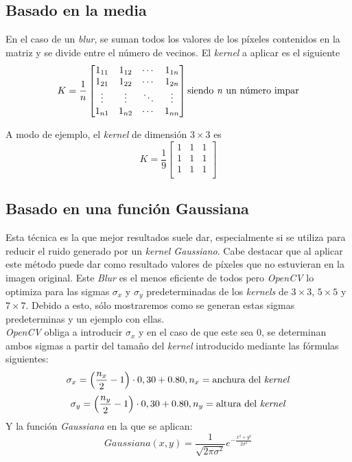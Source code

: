 \subsection{Basado en la media}
En el caso de un \emph{blur}, se suman todos los valores de los
píxeles contenidos en la matriz y se divide entre el número de
vecinos. El \emph{kernel} a aplicar es el siguiente
\begin{equation*}
  K = \frac{1}{n}
  \begin{bmatrix}
    1_{11} & 1_{12} & \cdots & 1_{1n} \\
    1_{21} & 1_{22} & \cdots & 1_{2n} \\
    \vdots & \vdots & \ddots & \vdots \\
    1_{n1} & 1_{n2} & \cdots & 1_{nn} \\
  \end{bmatrix}
  \text{siendo \emph{n} un número impar}
\end{equation*}

A modo de ejemplo, el \emph{kernel} de dimensión $3\times3$ es
\begin{equation*}
  K = \frac{1}{9}
  \begin{bmatrix}
    1 & 1 & 1 \\
    1 & 1 & 1 \\
    1 & 1 & 1 \\
  \end{bmatrix}
\end{equation*}
\subsection{Basado en una función Gaussiana}
Esta técnica es la que mejor resultados suele dar, especialmente si
se utiliza para reducir el ruido generado por un \emph{kernel
  Gaussiano}. Cabe destacar que al aplicar este método puede dar
como resultado valores de píxeles que no estuvieran en la imagen
original. Este \emph{Blur} es el menos eficiente de todos pero
\emph{OpenCV} lo optimiza para las sigmas $\sigma_x$ y $\sigma_y$
predeterminadas de los \emph{kernels} de $3\times3$, $5\times5$ y
$7\times7$. Debido a esto, sólo mostraremos como se
generan estas sigmas predeterminas y un ejemplo con ellas.\\
\emph{OpenCV} obliga a introducir $\sigma_x$ y en el caso de que este sea 0,
se determinan ambos sigmas a partir del tamaño del \emph{kernel}
introducido mediante las fórmulas siguientes:
\begin{equation*}
  \sigma_x = \left(\frac{n_x}{2} - 1 \right) \cdot 0,30 + 0.80, n_x = \text{anchura del \emph{kernel}}
\end{equation*}
\begin{equation*}
  \sigma_y = \left(\frac{n_y}{2} - 1 \right) \cdot 0,30 + 0.80, n_y = \text{altura del \emph{kernel}}
\end{equation*}
Y la función \emph{Gaussiana} en la que se aplican:
\begin{equation*}
Gaussiana(x, y) = \frac{1}{\sqrt{2 \pi \sigma^{2}}}e^{- \frac{x^{2}+y^{2}}{2\sigma^{2}}}
\end{equation*}


